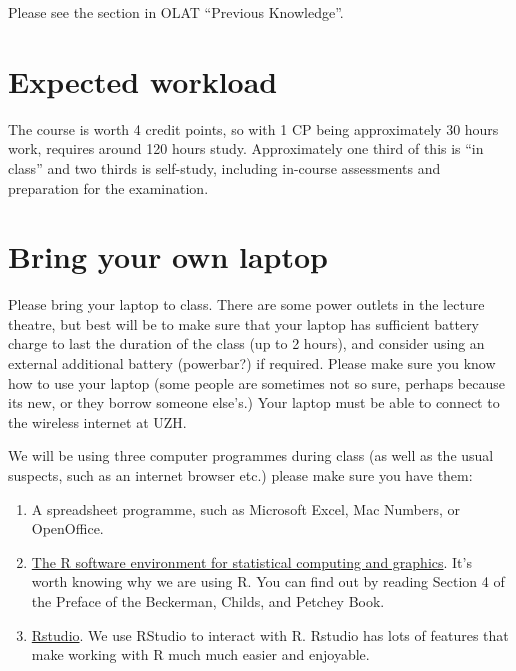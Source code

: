 \documentclass[
  letterpaper,
  8pt,
  a4paper]{book}
\begin{document}

Please see the section in OLAT ``Previous Knowledge''.

\section*{Expected workload}\label{expected-workload}


The course is worth 4 credit points, so with 1 CP being approximately 30
hours work, requires around 120 hours study. Approximately one third of
this is ``in class'' and two thirds is self-study, including in-course
assessments and preparation for the examination.

\section*{Bring your own laptop}\label{bring-your-own-laptop}


Please bring your laptop to class. There are some power outlets in the
lecture theatre, but best will be to make sure that your laptop has
sufficient battery charge to last the duration of the class (up to 2
hours), and consider using an external additional battery (powerbar?) if
required. Please make sure you know how to use your laptop (some people
are sometimes not so sure, perhaps because its new, or they borrow
someone else's.) Your laptop must be able to connect to the wireless
internet at UZH.

We will be using three computer programmes during class (as well as the
usual suspects, such as an internet browser etc.) please make sure you
have them:

\begin{enumerate}
\def\labelenumi{\arabic{enumi}.}
\item
  A spreadsheet programme, such as Microsoft Excel, Mac Numbers, or
  OpenOffice.
\item
  \href{https://www.r-project.org}{The R software environment for
  statistical computing and graphics}. It's worth knowing why we are
  using R. You can find out by reading Section 4 of the Preface of the
  Beckerman, Childs, and Petchey Book.
\item
  \href{https://posit.co/downloads/}{Rstudio}. We use RStudio to
  interact with R. Rstudio has lots of features that make working with R
  much much easier and enjoyable.
\end{enumerate}
\end{document}
